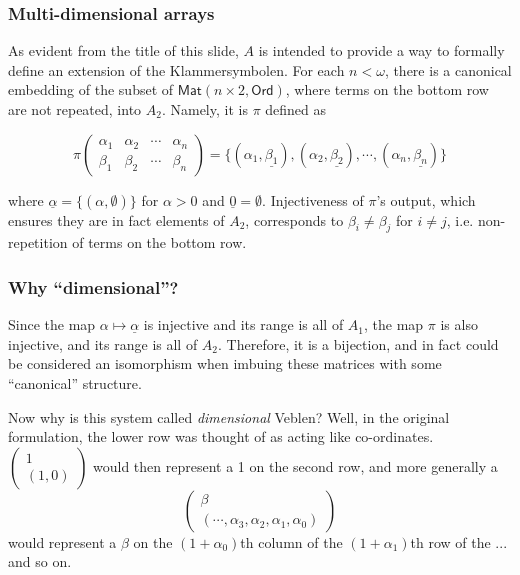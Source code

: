 \documentclass{beamer}
\begin{document}
\begin{frame}
\frametitle{Multi-dimensional arrays}
As evident from the title of this slide, $A$ is intended to provide a way to formally define an extension of the Klammersymbolen. For each $n < \omega$, there is a canonical embedding of the subset of $\mathsf{Mat}(n \times 2, \mathsf{Ord})$, where terms on the bottom row are not repeated, into $A_2$. \pause Namely, it is $\pi$ defined as

\begin{equation}
\pi\left(\begin{matrix} \alpha_1 & \alpha_2 & \cdots & \alpha_n \\ \beta_1 & \beta_2 & \cdots & \beta_n\end{matrix}\right) = \{(\alpha_1,\underline{\beta_1}), (\alpha_2,\underline{\beta_2}), \cdots, (\alpha_n,\underline{\beta_n})\}
\end{equation}

where $\underline{\alpha} = \{(\alpha,\emptyset)\}$ for $\alpha > 0$ and $\underline{0} = \emptyset$. \pause Injectiveness of $\pi$'s output, which ensures they are in fact elements of $A_2$, corresponds to $\beta_i \neq \beta_j$ for $i \neq j$, i.e. non-repetition of terms on the bottom row.
\end{frame}

\begin{frame}
\frametitle{Why ``dimensional''?}
Since the map $\alpha \mapsto \underline{\alpha}$ is injective and its range is all of $A_1$, the map $\pi$ is also injective, and its range is all of $A_2$. Therefore, it is a bijection, and in fact could be considered an isomorphism when imbuing these matrices with some ``canonical'' structure.

Now why is this system called \textit{dimensional} Veblen? Well, in the original formulation, the lower row was thought of as acting like co-ordinates. $\begin{pmatrix}1\\(1,0)\end{pmatrix}$ would then represent a 1 on the second row, and more generally a 
\begin{equation}
\left(\begin{matrix} \beta \\ (\cdots, \alpha_3, \alpha_2, \alpha_1, \alpha_0) \end{matrix}\right)
\end{equation}
would represent a $\beta$ on the $(1+\alpha_0)$th column of the $(1+\alpha_1)$th row of the ... and so on.
\end{frame}
\end{document}

